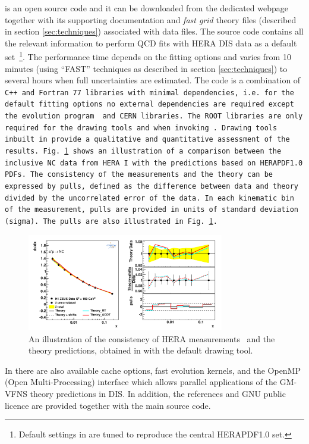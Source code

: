 
\fitter is an open source code and it can be downloaded from the dedicated webpage \cite{herafitter:page}
together with its supporting documentation and 
\emph{fast grid} theory files (described in section \ref{sec:techniques}) associated with data files.
The source code contains all the relevant information to perform QCD fits with HERA DIS data as a default 
set~\footnote{Default settings in \fitter are tuned to reproduce the central HERAPDF1.0 set.}. 
The performance time depends on the fitting options and varies from 10 minutes 
(using ``FAST'' techniques as described in section \ref{sec:techniques}) to several hours when 
full uncertainties are estimated. The \fitter code is a combination of \tt C++ \rm and \tt Fortran 77\rm \ libraries with minimal 
dependencies, i.e. for the default fitting options no external dependencies are required except the \qcdnum evolution program \cite{qcdnum} and CERN libraries. 
The \tt ROOT \rm  libraries are only required for the drawing tools and when invoking \applgrid.  
Drawing tools inbuilt in \fitter provide a qualitative and quantitative assessment of the results.
Fig.~\ref{fig:data} shows an illustration of a comparison between the inclusive NC data from HERA I
with the predictions based on HERAPDF1.0 PDFs.
The consistency of the measurements and the theory can be expressed by pulls, defined as the difference between data and theory divided by the uncorrelated error of the data. 
In each kinematic bin of the measurement, pulls are provided in units of standard deviation (sigma).  
The pulls are also illustrated in Fig.~\ref{fig:data}.
\begin{figure}[!ht]
   \centering
   \includegraphics[width=8.6cm]{datatheory.pdf}
   \caption{An illustration of the consistency of HERA measurements~\cite{h1zeus:2009wt} and the theory predictions, 
       obtained in \fitter with the default drawing tool.} 
 \label{fig:data}
\end{figure}


In \fitter there are also available cache options, fast evolution kernels, and the OpenMP (Open Multi-Processing) 
interface which allows parallel applications of the GM-VFNS theory predictions in DIS. 
In addition, the \fitter references and GNU public licence are provided 
together with the main source code. 


